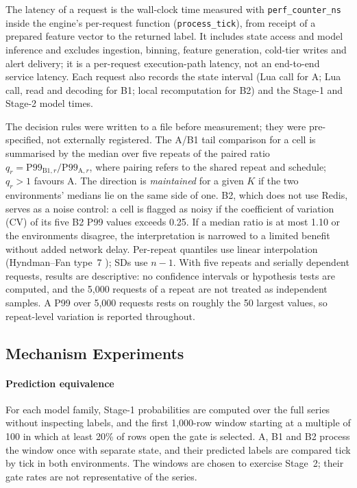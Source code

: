 \documentclass[a4paper,fleqn]{cas-dc}
\begin{document}
The latency of a request is the wall-clock time measured with \texttt{perf\_counter\_ns} inside the engine's per-request function (\texttt{process\_tick}), from receipt of a prepared feature vector to the returned label. It includes state access and model inference and excludes ingestion, binning, feature generation, cold-tier writes and alert delivery; it is a per-request execution-path latency, not an end-to-end service latency. Each request also records the state interval (Lua call for A; Lua call, read and decoding for B1; local recomputation for B2) and the Stage-1 and Stage-2 model times.

The decision rules were written to a file before measurement; they were pre-specified, not externally registered. The A/B1 tail comparison for a cell is summarised by the median over five repeats of the paired ratio $q_r=\mathrm{P99}_{\mathrm{B1},r}/\mathrm{P99}_{\mathrm{A},r}$, where pairing refers to the shared repeat and schedule; $q_r>1$ favours A. The direction is \emph{maintained} for a given $K$ if the two environments' medians lie on the same side of one. B2, which does not use Redis, serves as a noise control: a cell is flagged as noisy if the coefficient of variation (CV) of its five B2 P99 values exceeds 0.25. If a median ratio is at most 1.10 or the environments disagree, the interpretation is narrowed to a limited benefit without added network delay. Per-repeat quantiles use linear interpolation (Hyndman--Fan type~7 \citep{hyndman1996quantiles}); SDs use $n-1$. With five repeats and serially dependent requests, results are descriptive: no confidence intervals or hypothesis tests are computed, and the 5,000 requests of a repeat are not treated as independent samples. A P99 over 5,000 requests rests on roughly the 50 largest values, so repeat-level variation is reported throughout.

\subsection{Mechanism Experiments}
\label{subsec:mechanism}
\paragraph{Prediction equivalence} For each model family, Stage-1 probabilities are computed over the full series without inspecting labels, and the first 1,000-row window starting at a multiple of 100 in which at least 20\% of rows open the gate is selected. A, B1 and B2 process the window once with separate state, and their predicted labels are compared tick by tick in both environments. The windows are chosen to exercise Stage~2; their gate rates are not representative of the series.
\end{document}
